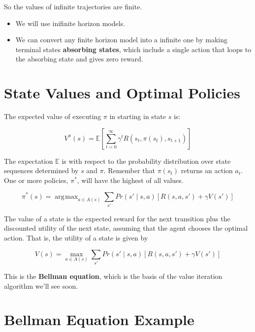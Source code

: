 \documentclass[11pt]{article}
\DeclareMathOperator*{\argmax}{arg\!max}
\begin{document}
So the values of infinite trajectories are finite.

\begin{itemize}
\item We will use inifinite horizon models.
\item We can convert any finite horizon model into a infinite one by making terminal states \textbf{absorbing states}, which include a single action that loops to the absorbing state and gives zero reward.
\end{itemize}
\section{State Values and Optimal Policies}
\label{sec:orgaab828c}

The expected value of executing \(\pi\) in starting in state \(s\) is:

\begin{equation*}
V^{\pi}(s) = \mathbb{E} \left[ \sum_{t=0}^{\infty} \gamma^t R(s_t, \pi(s_t), s_{t+1}) \right]
\end{equation*}

The expectation \(\mathbb{E}\) is with respect to the probability distribution over state sequences
determined by \(s\) and \(\pi\).  Remember that \(\pi(s_t)\) returns an action \(a_t\).  One or more policies, \(\pi^*\), will have the highest of all values.

\begin{equation*}
\pi^*(s) = \argmax_{a \in A(s)} \sum_{s'} Pr(s' \mid s, a) \left[ R(s, a, s') + \gamma V(s') \right] \tag{17.4}
\end{equation*}

The value of a state is the expected reward for the next transition plus the discounted utility of the next state, assuming that the agent chooses the optimal action. That is, the utility of a state is given by

\begin{equation*}
V(s) = \max_{a \in A(s)} \sum_{s'} Pr(s' \mid s, a) \left[ R(s, a, s') + \gamma V(s') \right] \tag{17.5}
\end{equation*}

This is the \textbf{Bellman equation}, which is the basis of the value iteration algorithm we'll see soon.
\section{Bellman Equation Example}
\label{sec:org42d8239}
\end{document}
